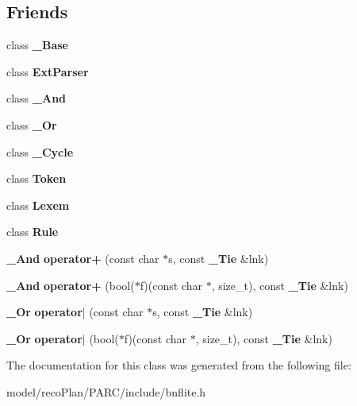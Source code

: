 \subsection*{Friends}
\begin{DoxyCompactItemize}
\item 
\mbox{\label{classbnf_1_1___tie_acc4a46af6ba91f5c229096b7f622876a}} 
class {\bfseries \+\_\+\+Base}
\item 
\mbox{\label{classbnf_1_1___tie_a56aeb37d353745b814d576d4eee8bf58}} 
class {\bfseries Ext\+Parser}
\item 
\mbox{\label{classbnf_1_1___tie_abc37899b09eb024e8e57c00ec8fba682}} 
class {\bfseries \+\_\+\+And}
\item 
\mbox{\label{classbnf_1_1___tie_abc2ecc13a8a23716fb474fcc5d47a88f}} 
class {\bfseries \+\_\+\+Or}
\item 
\mbox{\label{classbnf_1_1___tie_a42b7257dd7b67cb080c28eed1201d5e2}} 
class {\bfseries \+\_\+\+Cycle}
\item 
\mbox{\label{classbnf_1_1___tie_a48f5c1ca47af8dc65eca7e0274de96e2}} 
class {\bfseries Token}
\item 
\mbox{\label{classbnf_1_1___tie_a5e39c58451938ac9fc35e0ac18674f12}} 
class {\bfseries Lexem}
\item 
\mbox{\label{classbnf_1_1___tie_a6c87f8640d92f86217b1b5ac79943269}} 
class {\bfseries Rule}
\item 
\mbox{\label{classbnf_1_1___tie_ae39b09ed012034d4a0ca5e90ec961764}} 
\textbf{ \+\_\+\+And} {\bfseries operator+} (const char $\ast$s, const \textbf{ \+\_\+\+Tie} \&lnk)
\item 
\mbox{\label{classbnf_1_1___tie_affdc9f825c9dea37493c32c4e5547cb3}} 
\textbf{ \+\_\+\+And} {\bfseries operator+} (bool($\ast$f)(const char $\ast$, size\+\_\+t), const \textbf{ \+\_\+\+Tie} \&lnk)
\item 
\mbox{\label{classbnf_1_1___tie_a13f77fb3c0e59327b41449c74cfca230}} 
\textbf{ \+\_\+\+Or} {\bfseries operator$\vert$} (const char $\ast$s, const \textbf{ \+\_\+\+Tie} \&lnk)
\item 
\mbox{\label{classbnf_1_1___tie_a49635d0b72696d3519c0e4993b6636d4}} 
\textbf{ \+\_\+\+Or} {\bfseries operator$\vert$} (bool($\ast$f)(const char $\ast$, size\+\_\+t), const \textbf{ \+\_\+\+Tie} \&lnk)
\end{DoxyCompactItemize}


The documentation for this class was generated from the following file\+:\begin{DoxyCompactItemize}
\item 
model/reco\+Plan/\+P\+A\+R\+C/include/bnflite.\+h\end{DoxyCompactItemize}
